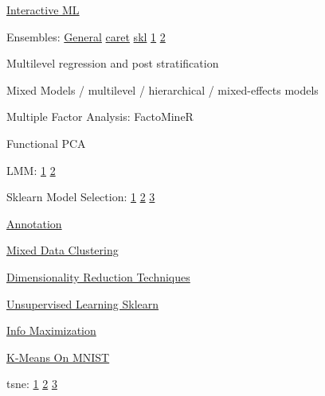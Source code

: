 \documentclass[]{book}
\begin{document}
\href{http://www.creativeai.net/posts/eivW6BvrrpyPf282d/interactive-machine-learning-an-overview-in-5-videos}{Interactive ML}

Ensembles: \href{http://mlwave.com/kaggle-ensembling-guide/}{General} \textbar{} \href{http://amunategui.github.io/blending-models/}{caret} \textbar{} \href{https://www.toptal.com/machine-learning/ensemble-methods-machine-learning}{skl} \textbar{} \href{http://blog.kaggle.com/2016/12/27/a-kagglers-guide-to-model-stacking-in-practice/}{1} \textbar{} \href{http://blog.kaggle.com/2017/06/15/stacking-made-easy-an-introduction-to-stacknet-by-competitions-grandmaster-marios-michailidis-kazanova/}{2}

Multilevel regression and post stratification

Mixed Models / multilevel / hierarchical / mixed-effects models

Multiple Factor Analysis: FactoMineR

Functional PCA

LMM: \href{http://edwardlib.org/tutorials/linear-mixed-effects-models}{1} \textbar{} \href{https://ourcodingclub.github.io/2017/03/15/mixed-models.html}{2}

Sklearn Model Selection: \href{http://scikit-learn.org/stable/modules/generated/sklearn.model_selection.GroupKFold.html}{1} \textbar{} \href{http://scikit-learn.org/stable/modules/generated/sklearn.model_selection.LeaveOneGroupOut.html}{2} \textbar{} \href{http://scikit-learn.org/stable/modules/generated/sklearn.model_selection.LeavePGroupsOut.html}{3}

\href{https://explosion.ai/blog/prodigy-annotation-tool-active-learning}{Annotation}

\href{https://www.r-bloggers.com/clustering-mixed-data-types-in-r/}{Mixed Data Clustering}

\href{https://colah.github.io/posts/2014-10-Visualizing-MNIST/}{Dimensionality Reduction Techniques}

\href{http://opensource.datacratic.com/mtlpy50/}{Unsupervised Learning Sklearn}

\href{http://www.inference.vc/unsupervised-learning-by-predicting-noise-an-information-maximization-view-2/}{Info Maximization}

\href{http://johnloeber.com/docs/kmeans.html}{K-Means On MNIST}

tsne: \href{http://distill.pub/2016/misread-tsne/}{1} \textbar{} \href{https://lvdmaaten.github.io/tsne/}{2} \textbar{} \href{https://index.pocketcluster.io/harveyslash-tsne-embedding-visualisation.html}{3}
\end{document}
